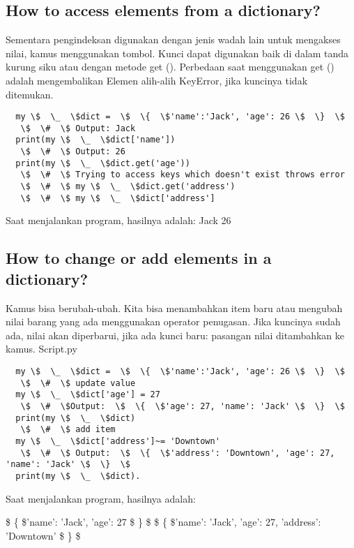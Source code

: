 \subsection{How to access elements from a dictionary?} 
Sementara pengindeksan digunakan dengan jenis wadah lain untuk mengakses nilai, kamus menggunakan tombol. Kunci dapat digunakan baik di dalam tanda kurung siku atau dengan metode get (). Perbedaan saat menggunakan get () adalah mengembalikan Elemen alih-alih KeyError, jika kuncinya tidak ditemukan. 
\begin{verbatim}
  my \$  \_  \$dict =  \$  \{  \$'name':'Jack', 'age': 26 \$  \}  \$ 
   \$  \#  \$ Output: Jack 
  print(my \$  \_  \$dict['name']) 
   \$  \#  \$ Output: 26 
  print(my \$  \_  \$dict.get('age')) 
   \$  \#  \$ Trying to access keys which doesn't exist throws error 
   \$  \#  \$ my \$  \_  \$dict.get('address') 
   \$  \#  \$ my \$  \_  \$dict['address'] 
\end{verbatim}   
Saat menjalankan program, hasilnya adalah: 
Jack 
26 

\subsection{How to change or add elements in a dictionary?}
Kamus bisa berubah-ubah. Kita bisa menambahkan item baru atau mengubah nilai barang yang ada menggunakan operator penugasan. 
Jika kuncinya sudah ada, nilai akan diperbarui, jika ada kunci baru: pasangan nilai ditambahkan ke kamus. 
Script.py
\begin{verbatim}
  my \$  \_  \$dict =  \$  \{  \$'name':'Jack', 'age': 26 \$  \}  \$ 
   \$  \#  \$ update value 
  my \$  \_  \$dict['age'] = 27 
   \$  \#  \$Output:  \$  \{  \$'age': 27, 'name': 'Jack' \$  \}  \$ 
  print(my \$  \_  \$dict) 
   \$  \#  \$ add item 
  my \$  \_  \$dict['address']~= 'Downtown'   
   \$  \#  \$ Output:  \$  \{  \$'address': 'Downtown', 'age': 27, 'name': 'Jack' \$  \}  \$ 
  print(my \$  \_  \$dict). 
\end{verbatim}  
Saat menjalankan program, hasilnya adalah: 

 \$  \{  \$'name': 'Jack', 'age': 27 \$  \}  \$ 
 \$  \{  \$'name': 'Jack', 'age': 27, 'address': 'Downtown' \$  \}  \$ 
 
